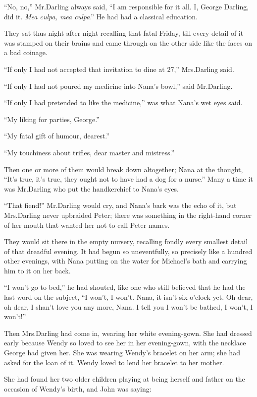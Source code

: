 “No, no,” Mr.\@ Darling always said,
“I am responsible for it all.
I, George Darling, did it.
\emph{Mea culpa, mea culpa}.”
He had had a classical education.

They sat thus night after night recalling that fatal Friday,
till every detail of it was stamped on their brains
and came through on the other side like the faces on a bad coinage.

“If only I had not accepted that invitation to dine at 27,” Mrs.\@ Darling said.

“If only I had not poured my medicine into Nana’s bowl,” said Mr.\@ Darling.

“If only I had pretended to like the medicine,” was what Nana’s wet eyes said.

“My liking for parties, George.”

“My fatal gift of humour, dearest.”

“My touchiness about trifles, dear master and mistress.”

Then one or more of them would break down altogether;
Nana at the thought, “It’s true, it’s true, they ought not to have had a dog for a nurse.”
Many a time it was Mr.\@ Darling who put the handkerchief to Nana’s eyes.

“That fiend!\@” Mr.\@ Darling would cry, and Nana’s bark was the echo of it,
but Mrs.\@ Darling never upbraided Peter;
there was something in the right-hand corner of her mouth that wanted her not to call Peter names.

They would sit there in the empty nursery,
recalling fondly every smallest detail of that dreadful evening.
It had begun so uneventfully, so precisely like a hundred other evenings,
with Nana putting on the water for Michael’s bath and carrying him to it on her back.

“I won’t go to bed,” he had shouted,
like one who still believed that he had the last word on the subject,
“I won’t, I won’t.
Nana, it isn’t six o’clock yet.
Oh dear, oh dear, I shan’t love you any more, Nana.
I tell you I won’t be bathed, I won’t, I won’t!”

Then Mrs.\@ Darling had come in, wearing her white evening-gown.
She had dressed early because Wendy so loved to see her in her evening-gown,
with the necklace George had given her.
She was wearing Wendy’s bracelet on her arm;
she had asked for the loan of it.
Wendy loved to lend her bracelet to her mother.

She had found her two older children playing at being herself and father on the occasion of Wendy’s birth,
and John was saying:

